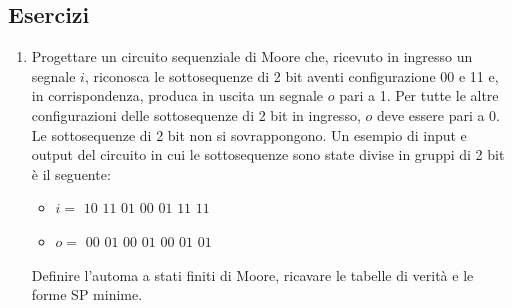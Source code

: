 \documentclass{article}
\begin{document}
\subsection{Esercizi}
\begin{enumerate}
    \item Progettare un circuito sequenziale di Moore che, ricevuto in ingresso un segnale $i$, riconosca le sottosequenze di 2 bit aventi configurazione 00 e 11 e, in corrispondenza, produca in uscita un segnale $o$ pari a 1. Per tutte le altre configurazioni delle sottosequenze di 2 bit in ingresso, $o$ deve essere pari a 0. Le sottosequenze di 2 bit non si sovrappongono. Un esempio di input e output del circuito in cui le sottosequenze sono state divise in gruppi di 2 bit è il seguente:
    \begin{itemize}
        \item $i =$ $10$ $11$ $01$ $00$ $01$ $11$ $11$
        \item $o =$ $00$ $01$ $00$ $01$ $00$ $01$ $01$
    \end{itemize}
    Definire l’automa a stati finiti di Moore, ricavare le tabelle di verità e le forme SP minime.


\end{enumerate}
\end{document}
